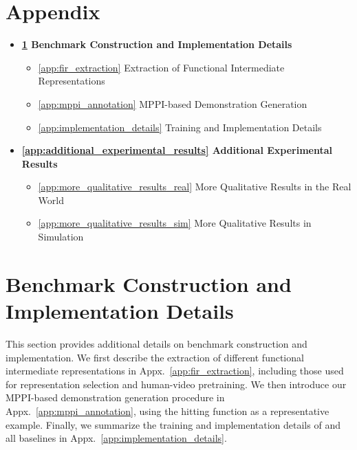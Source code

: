 \appendix

\section*{Appendix}


\begin{itemize}
  \item[] \textbf{\ref{app:benchmarks} Benchmark Construction and Implementation Details}
    \begin{itemize}
      \item[] \ref{app:fir_extraction} Extraction of Functional Intermediate Representations
      \item[] \ref{app:mppi_annotation} MPPI-based Demonstration Generation
      \item[] \ref{app:implementation_details} Training and Implementation Details
    \end{itemize}
    
  \item[] \textbf{\ref{app:additional_experimental_results} Additional Experimental Results}
    \begin{itemize}
      \item[] \ref{app:more_qualitative_results_real} More Qualitative Results in the Real World
      \item[] \ref{app:more_qualitative_results_sim} More Qualitative Results in Simulation
    \end{itemize}
\end{itemize}



\section{Benchmark Construction and Implementation Details}
\label{app:benchmarks}

This section provides additional details on benchmark construction and implementation.
We first describe the extraction of different functional intermediate representations in Appx.~\ref{app:fir_extraction}, including those used for representation selection and human-video pretraining.
We then introduce our MPPI-based demonstration generation procedure in Appx.~\ref{app:mppi_annotation}, using the hitting function as a representative example.
Finally, we summarize the training and implementation details of \algoname{} and all baselines in Appx.~\ref{app:implementation_details}.

